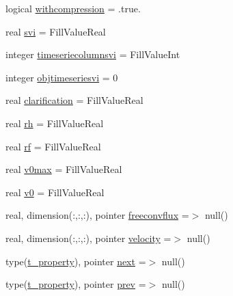 \begin{DoxyCompactItemize}
\item 
logical \mbox{\hyperlink{structmodulefreeverticalmovement_1_1t__property_a1351577c8ee0a9c10a326a819a32e563}{withcompression}} = .true.
\item 
real \mbox{\hyperlink{structmodulefreeverticalmovement_1_1t__property_a9632383faf5b1f76e9263e8108fdf9da}{svi}} = Fill\+Value\+Real
\item 
integer \mbox{\hyperlink{structmodulefreeverticalmovement_1_1t__property_ab17e3ba285ab1e33212be30e4e37e59a}{timeseriecolumnsvi}} = Fill\+Value\+Int
\item 
integer \mbox{\hyperlink{structmodulefreeverticalmovement_1_1t__property_ad80b754d015d9753c5ead6341bbc733f}{objtimeseriesvi}} = 0
\item 
real \mbox{\hyperlink{structmodulefreeverticalmovement_1_1t__property_aae900fd01af0516e475b6d35982ab5a2}{clarification}} = Fill\+Value\+Real
\item 
real \mbox{\hyperlink{structmodulefreeverticalmovement_1_1t__property_a17dc485a421c815ff592fe5260b1dde2}{rh}} = Fill\+Value\+Real
\item 
real \mbox{\hyperlink{structmodulefreeverticalmovement_1_1t__property_a0e2516c12e4bb645340c7aa8b6dcda7c}{rf}} = Fill\+Value\+Real
\item 
real \mbox{\hyperlink{structmodulefreeverticalmovement_1_1t__property_ad1e961424079e39d7711a46d310ef0c8}{v0max}} = Fill\+Value\+Real
\item 
real \mbox{\hyperlink{structmodulefreeverticalmovement_1_1t__property_a1b0c8220cc6c752973d80e6f9189f058}{v0}} = Fill\+Value\+Real
\item 
real, dimension(\+:,\+:,\+:), pointer \mbox{\hyperlink{structmodulefreeverticalmovement_1_1t__property_a6d24ece81bc13b87a73a91f7157ef8f1}{freeconvflux}} =$>$ null()
\item 
real, dimension(\+:,\+:,\+:), pointer \mbox{\hyperlink{structmodulefreeverticalmovement_1_1t__property_a73a28bd1d91aff32f5c7fa2a433a82ff}{velocity}} =$>$ null()
\item 
type(\mbox{\hyperlink{structmodulefreeverticalmovement_1_1t__property}{t\+\_\+property}}), pointer \mbox{\hyperlink{structmodulefreeverticalmovement_1_1t__property_a7b83df0a37781b2ca24a68f2e0d3d530}{next}} =$>$ null()
\item 
type(\mbox{\hyperlink{structmodulefreeverticalmovement_1_1t__property}{t\+\_\+property}}), pointer \mbox{\hyperlink{structmodulefreeverticalmovement_1_1t__property_a215e60891c271a7a19f88ef8e29eee8b}{prev}} =$>$ null()
\end{DoxyCompactItemize}


